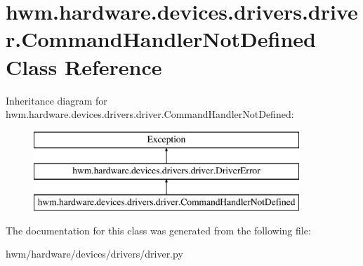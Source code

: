 \hypertarget{classhwm_1_1hardware_1_1devices_1_1drivers_1_1driver_1_1_command_handler_not_defined}{\section{hwm.\-hardware.\-devices.\-drivers.\-driver.\-Command\-Handler\-Not\-Defined Class Reference}
\label{classhwm_1_1hardware_1_1devices_1_1drivers_1_1driver_1_1_command_handler_not_defined}
}
Inheritance diagram for hwm.\-hardware.\-devices.\-drivers.\-driver.\-Command\-Handler\-Not\-Defined\-:\begin{figure}[H]
\begin{center}
\leavevmode
\includegraphics[height=3.000000cm]{classhwm_1_1hardware_1_1devices_1_1drivers_1_1driver_1_1_command_handler_not_defined}
\end{center}
\end{figure}


The documentation for this class was generated from the following file\-:\begin{DoxyCompactItemize}
\item 
hwm/hardware/devices/drivers/driver.\-py\end{DoxyCompactItemize}
